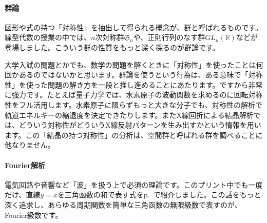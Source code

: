 \paragraph{群論}

図形や式の持つ「対称性」を抽出して得られる概念が、群と呼ばれるものです。線型代数の授業の中では、$n$次対称群$\mathfrak{S}_n$や、正則行列のなす群$GL_n(\mathbb{R})$などが登場しました。こういう群の性質をもっと深く探るのが群論です。

大学入試の問題とかでも、数学の問題を解くときに「対称性」を使ったことは何回かあるのではないかと思います。群論を使うという行為は、ある意味で「対称性」を使った問題の解き方を一段と推し進めることにあたります。ですから非常に強力です。たとえば量子力学では、水素原子の波動関数を求めるのに回転対称性をフル活用します。水素原子に限らずもっと大きな分子でも、対称性の解析で軌道エネルギーの縮退度を決定できたりします。またX線回折による結晶解析では、どういう対称性がどういうX線反射パターンを生み出すかという情報を用います。この「結晶の持つ対称性」の分析は、空間群と呼ばれる群を調べることに他なりません。

\paragraph{Fourier解析}

電気回路や音響など「波」を扱う上で必須の理論です。このプリント中でも一度だけ、直線$y = x$を三角函数の和で表す式をp.~\pageref{paragraph:Fourier_series}で紹介しました。この話をもっと深く追求し、あらゆる周期関数を簡単な三角函数の無限級数で表すのが、Fourier級数です。

